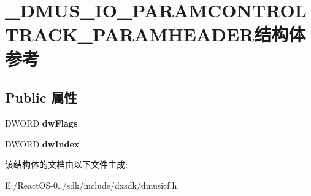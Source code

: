 \hypertarget{struct___d_m_u_s___i_o___p_a_r_a_m_c_o_n_t_r_o_l_t_r_a_c_k___p_a_r_a_m_h_e_a_d_e_r}{}\section{\+\_\+\+D\+M\+U\+S\+\_\+\+I\+O\+\_\+\+P\+A\+R\+A\+M\+C\+O\+N\+T\+R\+O\+L\+T\+R\+A\+C\+K\+\_\+\+P\+A\+R\+A\+M\+H\+E\+A\+D\+E\+R结构体 参考}
\label{struct___d_m_u_s___i_o___p_a_r_a_m_c_o_n_t_r_o_l_t_r_a_c_k___p_a_r_a_m_h_e_a_d_e_r}
\subsection*{Public 属性}
\begin{DoxyCompactItemize}
\item 
\mbox{\label{struct___d_m_u_s___i_o___p_a_r_a_m_c_o_n_t_r_o_l_t_r_a_c_k___p_a_r_a_m_h_e_a_d_e_r_abb3f5d54b9e7d98c6df2fc743b96fca9}} 
D\+W\+O\+RD {\bfseries dw\+Flags}
\item 
\mbox{\label{struct___d_m_u_s___i_o___p_a_r_a_m_c_o_n_t_r_o_l_t_r_a_c_k___p_a_r_a_m_h_e_a_d_e_r_a19d66e6306a0f9962ba9118f65c9f01f}} 
D\+W\+O\+RD {\bfseries dw\+Index}
\end{DoxyCompactItemize}


该结构体的文档由以下文件生成\+:\begin{DoxyCompactItemize}
\item 
E\+:/\+React\+O\+S-\/0../sdk/include/dxsdk/dmusicf.\+h\end{DoxyCompactItemize}
